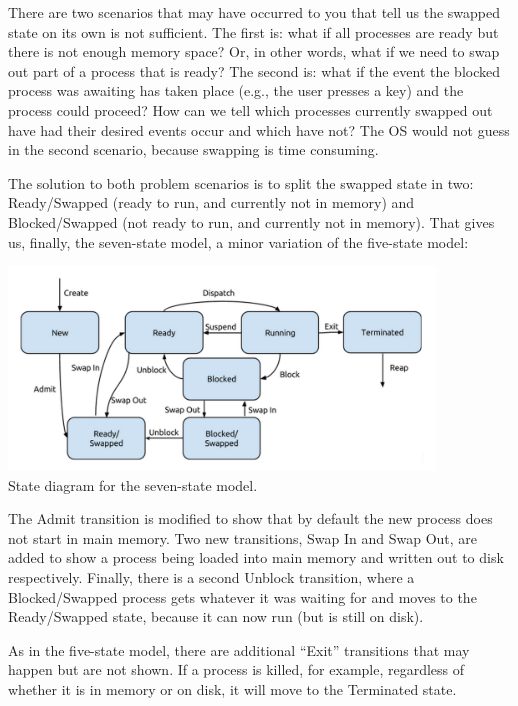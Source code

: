 There are two scenarios that may have occurred to you that tell us the swapped state on its own is not sufficient. The first is: what if all processes are ready but there is not enough memory space? Or, in other words, what if we need to swap out part of a process that is ready? The second is: what if the event the blocked process was awaiting has taken place (e.g., the user presses a key) and the process could proceed? How can we tell which processes currently swapped out have had their desired events occur and which have not? The OS would not guess in the second scenario, because swapping is time consuming.

The solution to both problem scenarios is to split the swapped state in two: Ready/Swapped (ready to run, and currently not in memory) and Blocked/Swapped (not ready to run, and currently not in memory). That gives us, finally, the seven-state model, a minor variation of the five-state model:

\begin{center}
	\includegraphics[width=0.85\textwidth]{images/7-state-model.png}\\
	State diagram for the seven-state model.
\end{center}

The Admit transition is modified to show that by default the new process does not start in main memory. Two new transitions, Swap In and Swap Out, are added to show a process being loaded into main memory and written out to disk respectively. Finally, there is a second Unblock transition, where a Blocked/Swapped process gets whatever it was waiting for and moves to the Ready/Swapped state, because it can now run (but is still on disk).

As in the five-state model, there are additional ``Exit'' transitions that may happen but are not shown. If a process is killed, for example, regardless of whether it is in memory or on disk, it will move to the Terminated state.




